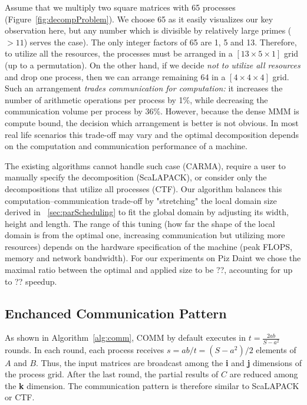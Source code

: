 \documentclass[sigplan,review,anonymous,10pt]{acmart}\settopmatter{printfolios=true,printccs=false,printacmref=false}
\begin{document}
Assume that we multiply two square matrices with 65 
processes (Figure~\ref{fig:decompProblem}). We choose 65 as it easily 
visualizes our key observation here, but any number which is divisible by 
relatively large primes ($>11$) serves the case).
  The only integer factors 
of 65 are 1, 5 and 13. Therefore, to 
utilize all the resources, the processes must be arranged in a $[13 
\times 5 \times 1]$ grid (up to a permutation). On the other hand, if 
we decide \emph{not to utilize all resources} 
and drop one process, then we can arrange remaining 64 in a $[4 
\times 4 \times 4]$ grid. Such an arrangement \emph{trades communication 
	for computation:} it increases the number of arithmetic operations 
per process by 1\%, while decreasing the communication volume per 
process by 36\%. However, because the dense MMM is compute bound, the 
decision which arrangement is better is not obvious.
In most real life scenarios this trade-off may vary and the optimal 
decomposition depends on the computation and communication 
performance 
of a 
machine. 



The existing algorithms cannot handle such case (CARMA), 
require a user to manually specify the decomposition (ScaLAPACK), or 
consider only the decompositions that utilize all processes
(CTF). Our algorithm balances this computation--communication 
trade-off by "stretching" the local domain size 
derived in ~\cref{sec:parScheduling} to fit the global 
domain by adjusting its width, height and length. The range of this 
tuning (how far the shape of the local domain is from the optimal one, 
increasing communication but utilizing more resources) 
depends on the hardware specification of the 
machine (peak FLOPS, memory and network bandwidth). For our 
experiments on Piz Daint we chose the maximal ratio between the 
optimal and applied size to be ??, accounting for up to ?? speedup.

\subsection{Enchanced Communication Pattern}
\label{sec:commPattern}
As shown in Algorithm~\ref{alg:comm}, COMM by default executes in $t = 
\frac{2ab}{S - a^2}$ 
rounds. In each round, each process receives $s = ab/t = (S - a^2)/2$ 
elements of 
$A$ 
and 
$B$. Thus, the input matrices are broadcast among the \textbf{i} and \textbf{j} 
dimensions of the process grid. After the last round, the partial results of 
$C$ 
are reduced among the \textbf{k} dimension. The communication pattern is 
therefore similar to ScaLAPACK or CTF.
\end{document}
